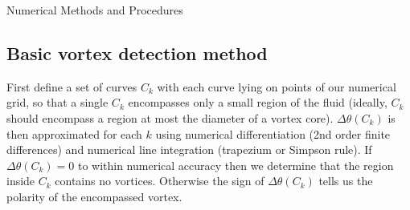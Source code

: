 \begin{chapter}{\label{cha:numerics}Numerical Methods and Procedures}
\subsection{\label{section:vortexloc} Basic vortex detection method}
First define a set of curves $C_k$ with each curve lying on points of our numerical grid, so that a single $C_k$ encompasses only a small region of the fluid (ideally, $C_k$ should encompass a region at most the diameter of a vortex core). $\Delta\theta(C_k)$ is then approximated for each $k$ using numerical differentiation (2nd order finite differences) and numerical line integration (trapezium or Simpson rule). If $\Delta\theta(C_k) = 0$ to within numerical accuracy then we determine that the region inside $C_k$ contains no vortices. Otherwise the sign of $\Delta\theta(C_k)$ tells us the polarity of the encompassed vortex.


\end{chapter}
